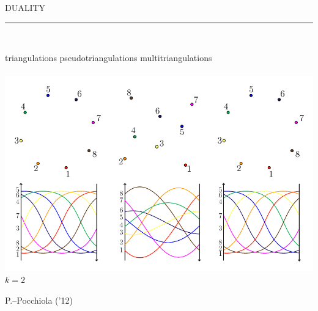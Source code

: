 \documentclass[12pt,titlepage,landscape,a4paper]{article}
\newcommand{\textemoyen}{\fontsize{23}{27}\selectfont}
\newenvironment{slide}[1]
{
\newpage
\begin{center}
{\blue \textemoyen \uppercase{#1}}\\
\end{center}
\vspace{-1cm}
\rule{\textwidth}{0.5 pt}\\
\vspace{-.8cm}
}
{\vspace*{-3cm}}
\newcommand{\violet}{\color{violet}} %
\newcommand{\blue}{\color{blue}} %
\newcommand{\papier}[1]{{\violet\fontsize{15}{20}\selectfont #1}} %
\begin{document}

%
%
%
%
%

\begin{slide}{Duality}
\hspace{1.6cm} triangulations \hspace{3.4cm} pseudotriangulations \hspace{2.5cm} multitriangulations\\
\vspace{-.5cm}\\
\vspace*{-2cm}
\hspace*{-.6cm}\includegraphics[scale=1.9]{geometricStructures5}
\vspace{-8.5cm} \\ \hspace*{25.7cm} ${k=2}$

\vspace{7.6cm}
\papier{P.--Pocchiola ('12)}

\vspace*{-3cm}
\end{slide}
\end{document}
